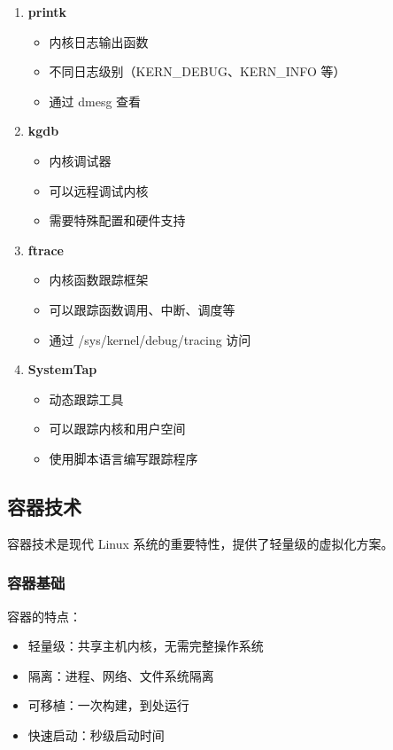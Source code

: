 \begin{enumerate}
  \item \textbf{printk}
    \begin{itemize}
      \item 内核日志输出函数
      \item 不同日志级别（KERN\_DEBUG、KERN\_INFO 等）
      \item 通过 dmesg 查看
    \end{itemize}

  \item \textbf{kgdb}
    \begin{itemize}
      \item 内核调试器
      \item 可以远程调试内核
      \item 需要特殊配置和硬件支持
    \end{itemize}

  \item \textbf{ftrace}
    \begin{itemize}
      \item 内核函数跟踪框架
      \item 可以跟踪函数调用、中断、调度等
      \item 通过 /sys/kernel/debug/tracing 访问
    \end{itemize}

  \item \textbf{SystemTap}
    \begin{itemize}
      \item 动态跟踪工具
      \item 可以跟踪内核和用户空间
      \item 使用脚本语言编写跟踪程序
    \end{itemize}
\end{enumerate}

\subsection{容器技术}

容器技术是现代 Linux 系统的重要特性，提供了轻量级的虚拟化方案。

\subsubsection{容器基础}


容器的特点：
\begin{itemize}
  \item 轻量级：共享主机内核，无需完整操作系统
  \item 隔离：进程、网络、文件系统隔离
  \item 可移植：一次构建，到处运行
  \item 快速启动：秒级启动时间
\end{itemize}

